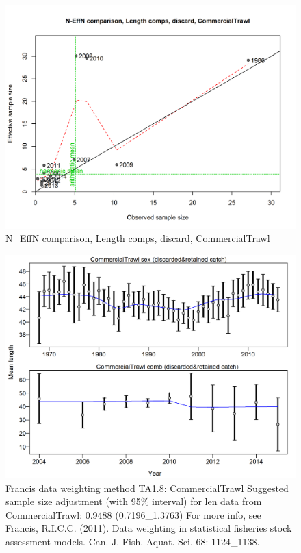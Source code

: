 \documentclass[12pt,]{article}
\begin{document}
\begin{figure}[htbp]
\centering
\includegraphics{./r4ss/plots_mod1/comp_lenfit_sampsize_flt1mkt1.png}
\caption{N\_EffN comparison, Length comps, discard, CommercialTrawl
\label{fig:mod1_8_comp_lenfit_sampsize_flt1mkt1}}
\end{figure}

\begin{figure}[htbp]
\centering
\includegraphics{./r4ss/plots_mod1/comp_lenfit_data_weighting_TA1.8_CommercialTrawl.png}
\caption{Francis data weighting method TA1.8: CommercialTrawl Suggested
sample size adjustment (with 95\% interval) for len data from
CommercialTrawl: 0.9488 (0.7196\_1.3763) For more info, see Francis,
R.I.C.C. (2011). Data weighting in statistical fisheries stock
assessment models. Can. J. Fish. Aquat. Sci. 68: 1124\_1138.
\label{fig:mod1_9_comp_lenfit_data_weighting_TA1.8_CommercialTrawl}}
\end{figure}
\end{document}
